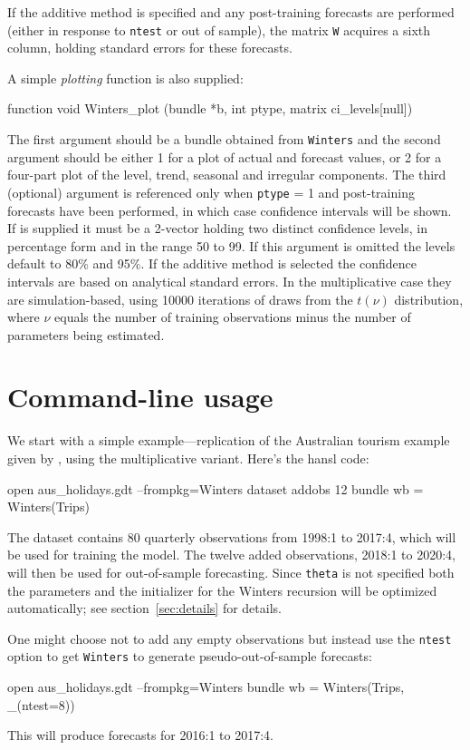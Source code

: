 \documentclass{article}
\begin{document}
If the additive method is specified and any post-training forecasts are
performed (either in response to \texttt{ntest} or out of sample), the
matrix \texttt{W} acquires a sixth column, holding standard errors for
these forecasts.

A simple \textit{plotting} function is also supplied:
\begin{nscode}
function void Winters_plot (bundle *b, int ptype, matrix ci_levels[null])
\end{nscode}
The first argument should be a bundle obtained from \texttt{Winters} and
the second argument should be either 1 for a plot of actual and forecast
values, or 2 for a four-part plot of the level, trend, seasonal and
irregular components. The third (optional) argument is referenced only
when \texttt{ptype} = 1 and post-training forecasts have been performed,
in which case confidence intervals will be shown. If  is
supplied it must be a 2-vector holding two distinct confidence levels,
in percentage form and in the range 50 to 99. If this argument is
omitted the levels default to 80\% and 95\%. If the additive method is
selected the confidence intervals are based on analytical standard
errors. In the multiplicative case they are simulation-based, using
10000 iterations of draws from the $t(\nu)$ distribution, where $\nu$
equals the number of training observations minus the number of
parameters being estimated.

\section{Command-line usage}
\label{sec:auto}

We start with a simple example---replication of the Australian tourism
example given by \cite{hyndman2021}, using the multiplicative
variant. Here's the hansl code:\label{pg:ex1}
\begin{nscode}
open aus_holidays.gdt --frompkg=Winters
dataset addobs 12
bundle wb = Winters(Trips)
\end{nscode}

The  dataset contains 80 quarterly observations from
1998:1 to 2017:4, which will be used for training the model. The twelve
added observations, 2018:1 to 2020:4, will then be used for
out-of-sample forecasting. Since \texttt{theta} is not specified
both the parameters and the initializer for the Winters recursion
will be optimized automatically; see section~\ref{sec:details} for
details.

One might choose not to add any empty observations but instead use the
\texttt{ntest} option to get \texttt{Winters} to generate
pseudo-out-of-sample forecasts:
\begin{nscode}
open aus_holidays.gdt --frompkg=Winters
bundle wb = Winters(Trips, _(ntest=8))
\end{nscode}
This will produce forecasts for 2016:1 to 2017:4.
\end{document}
